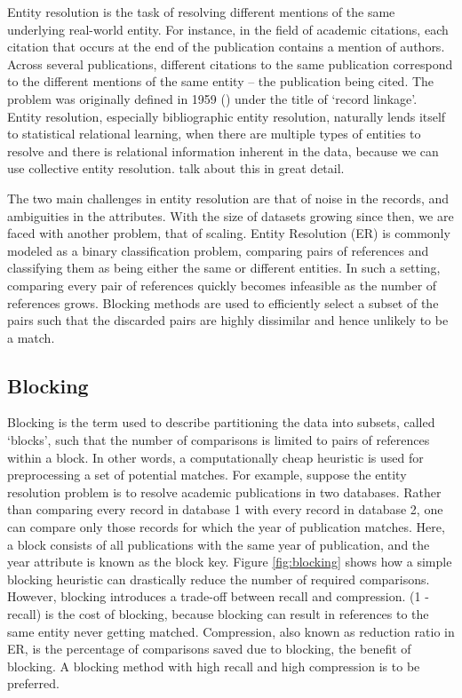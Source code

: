 \documentclass{article}
\begin{document}
        Entity resolution is the task of resolving different mentions of the same underlying real-world entity. For instance, in the field of academic citations, each citation that occurs at the end of the publication contains a mention of authors. Across several publications, different citations to the same publication correspond to the different mentions of the same entity -- the publication being cited. The problem was originally defined in 1959 (\cite{newcombe1967automatic}) under the title of `record linkage'. Entity resolution, especially bibliographic entity resolution, naturally lends itself to statistical relational learning, when there are multiple types of entities to resolve and there is relational information inherent in the data, because we can use collective entity resolution. \cite{Bhattacharya:2007:CER:1217299.1217304} talk about this in great detail. 
        
        The two main challenges in entity resolution are that of noise in the records, and ambiguities in the attributes. With the size of datasets growing since then, we are faced with another problem, that of scaling. Entity Resolution (ER) is commonly modeled as a binary classification problem, comparing pairs of references and classifying them as being either the same or different entities. In such a setting, comparing every pair of references quickly becomes infeasible as the number of references grows. Blocking methods are used to efficiently select a subset of the pairs such that the discarded pairs are highly dissimilar and hence unlikely to be a match.
        
    \subsection{Blocking}
        Blocking is the term used to describe partitioning the data into subsets, called `blocks', such that the number of comparisons is limited to pairs of references within a block.
        In other words, a computationally cheap heuristic is used for preprocessing a set of potential matches.
        For example, suppose the entity resolution problem is to resolve academic publications in two databases.
        Rather than comparing every record in database 1 with every record in database 2, one can compare only those records for which the year of publication matches. Here, a block consists of all publications with the same year of publication, and the year attribute is known as the block key.
        Figure \ref{fig:blocking} shows how a simple blocking heuristic can drastically reduce the number of required comparisons. However, blocking introduces a trade-off between recall and compression. (1 - recall) is the cost of blocking, because blocking can result in references to the same entity never getting matched. Compression, also known as reduction ratio in ER, is the percentage of comparisons saved due to blocking, the benefit of blocking. A blocking method with high recall and high compression is to be preferred.
\end{document}
